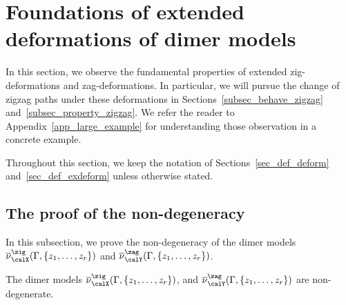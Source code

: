 \section{Foundations of extended deformations of dimer models}\label{sec_proof}

In this section, we observe the fundamental properties of extended zig-deformations and zag-deformations.
In particular, we will pursue the change of zigzag paths under these deformations
in Sections~\ref{subsec_behave_zigzag} and~\ref{subsec_property_zigzag}.
We refer the reader to Appendix~\ref{app_large_example} for understanding those observation in a concrete example.

Throughout this section, we keep the notation of Sections~\ref{sec_def_deform} and~\ref{sec_def_exdeform} unless otherwise stated.

\subsection{The proof of the non-degeneracy}\label{subsec_nondegenerate_deformation}

In this subsection, we prove the non-degeneracy of the dimer models $\overline{\nu}^\zig_\calX(\Gamma, \{z_1,\dots,z_r\})$ and $\overline{\nu}^\zag_\calY(\Gamma, \{z_1,\dots,z_r\})$.

\begin{Proposition}\label{prop_nondegenerate}
The dimer models $\overline{\nu}^\zig_\calX(\Gamma, \{z_1,\dots,z_r\})$, and $\overline{\nu}^\zag_\calY(\Gamma, \{z_1,\dots,z_r\})$ are non-degenerate.
\end{Proposition}


